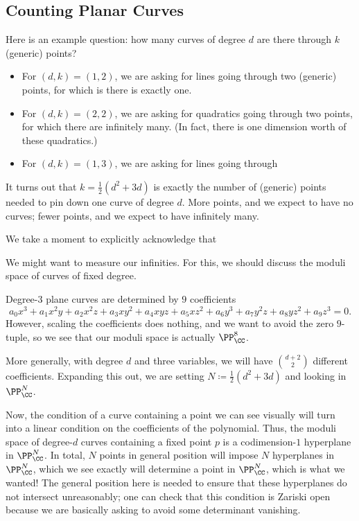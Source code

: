 \documentclass{article}
\begin{document}
\subsection{Counting Planar Curves}
Here is an example question: how many curves of degree $d$ are there through $k$ (generic) points?
\begin{itemize}
	\item For $(d,k)=(1,2)$, we are asking for lines going through two (generic) points, for which is there is exactly one.
	\item For $(d,k)=(2,2)$, we are asking for quadratics going through two points, for which there are infinitely many. (In fact, there is one dimension worth of these quadratics.)
	\item For $(d,k)=(1,3)$, we are asking for lines going through 
\end{itemize}
It turns out that $k=\frac12\left(d^2+3d\right)$ is exactly the number of (generic) points needed to pin down one curve of degree $d$. More points, and we expect to have no curves; fewer points, and we expect to have infinitely many.
\begin{remark}
	We take a moment to explicitly acknowledge that 
\end{remark}
We might want to measure our infinities. For this, we should discuss the moduli space of curves of fixed degree.
\begin{example}
	Degree-$3$ plane curves are determined by $9$ coefficients
	\[a_0x^3+a_1x^2y+a_2x^2z+a_3xy^2+a_4xyz+a_5xz^2+a_6y^3+a_7y^2z+a_8yz^2+a_9z^3=0.\]
	However, scaling the coefficients does nothing, and we want to avoid the zero $9$-tuple, so we see that our moduli space is actually $\PP^8_\CC$.
\end{example}
More generally, with degree $d$ and three variables, we will have $\binom{d+2}2$ different coefficients. Expanding this out, we are setting $N\coloneqq\frac12\left(d^2+3d\right)$ and looking in $\PP^N_\CC$.

Now, the condition of a curve containing a point we can see visually will turn into a linear condition on the coefficients of the polynomial. Thus, the moduli space of degree-$d$ curves containing a fixed point $p$ is a codimension-$1$ hyperplane in $\PP^N_\CC$. In total, $N$ points in general position will impose $N$ hyperplanes in $\PP^N_\CC$, which we see exactly will determine a point in $\PP^N_\CC$, which is what we wanted! The general position here is needed to ensure that these hyperplanes do not intersect unreasonably; one can check that this condition is Zariski open because we are basically asking to avoid some determinant vanishing.
\end{document}
